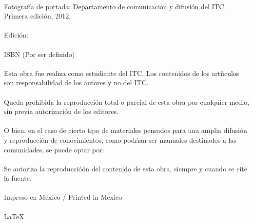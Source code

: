 \noindent
\vspace{4cm}
\\
Fotografía de portada: Departamento de comunicaci\'{o}n y difusi\'{o}n del ITC.\\
Primera edición, 2012.\\
\\
Edici\'{o}n:\\%
\\
ISBN (Por ser definido)\\
\\
Esta obra fue realiza como estudiante del ITC. Los contenidos de los artí\'{\i}culos son responsabilidad de los autores y no del ITC.\\
\\
Queda prohibida la reproducci\'{o}n total o parcial de esta obra por cualquier medio, sin previa autorizaci\'{o}n de los editores.\\
\\
O bien, en el caso de cierto tipo de materiales pensados para una amplia difusi\'{o}n y reproducci\'{o}n de conocimientos, como podr\'{\i}an ser manuales destinados a las comunidades, se puede optar por:\\
\\
Se autoriza la reproducció\'{o}n del contenido de esta obra, siempre y cuando se cite la fuente.\\
\\
Impreso en M\'{e}xico / Printed in Mexico\\
\\
\LaTeX 